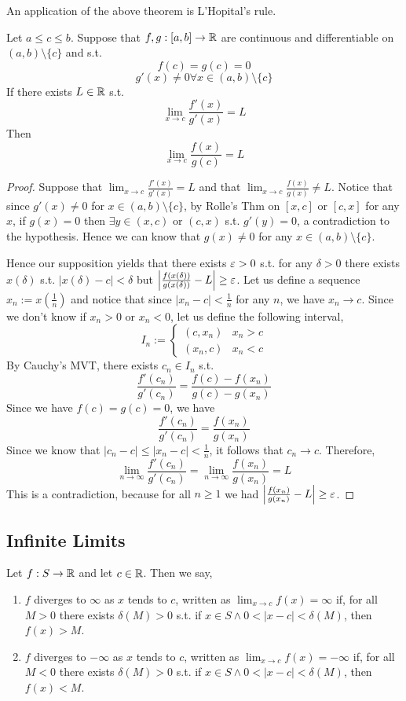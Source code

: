 An application of the above theorem is L'Hopital's rule.
\begin{theorem}
  Let $a\leq c \leq b$. Suppose that $f,g:[a,b]\to\mathbb R$ are continuous and differentiable
  on $(a,b)\setminus\{c\}$ and s.t. 
  \[f(c)=g(c)=0 \]
  \[g'(x)\neq 0 \forall x\in (a,b)\setminus\{c\}\]
  If there exists $L\in\mathbb R$ s.t. 
  \[\lim_{x\to c} \frac{f'(x)}{g'(x)}=L\]
  Then 
  \[\lim_{x\to c} \frac{f(x)}{g(c)}=L\]

  \label{<+label+>}
\end{theorem}
\begin{proof}
  Suppose that $\lim_{x\to c}\frac{f'(x)}{g'(x)}=L$ and that $\lim_{x\to
  c}\frac{f(x)}{g(x)}\neq L$. Notice that since $g'(x)\neq 0$ for $x\in
  (a,b)\setminus\{c\}$, by Rolle's Thm on $[x,c]$ or $[c,x]$ for any $x$, if $g(x)= 0$
  then $\exists y\in (x,c)$ or $(c,x)$ s.t. $g'(y)=0$, a contradiction to the hypothesis.
  Hence we can know that $g(x)\neq 0$ for any $x\in (a,b)\setminus\{c\}$.

  Hence our supposition yields that there exists $\varepsilon>0$ s.t. for any $\delta>0$ there
  exists $x(\delta)$ s.t. $|x(\delta)-c|<\delta$ but
  $\left|\frac{f(x(\delta))}{g(x(\delta))} -L\right| \geq \varepsilon$. Let us define a sequence
  $x_n:=x(\frac{1}{n})$ and notice that since $|x_n-c|<\frac{1}{n}$ for any $n$, we have
  $x_n\to c$. Since we don't know if $x_n>0$ or $x_n<0$, let us define the following
  interval,
  \[I_n := \begin{cases}
      (c,x_n) & x_n>c \\
      (x_n,c) & x_n<c
    \end{cases}
  \]
  By Cauchy's MVT, there exists $c_n\in I_n$ s.t. 
  \[ \frac{f'(c_n)}{g'(c_n)} = \frac{f(c) - f(x_n)}{g(c)-g(x_n)}\]
  Since we have $f(c)=g(c)=0$, we have 
  \[\frac{f'(c_n)}{g'(c_n)} =  \frac{f(x_n)}{g(x_n)}  \]
  Since we know that $|c_n-c|\leq |x_n-c| <\frac{1}{n}$, it follows that $c_n\to c$.
  Therefore, 
  \[\lim_{n\to \infty}\frac{f'(c_n)}{g'(c_n)} =  \lim_{n\to \infty}\frac{f(x_n)}{g(x_n)} =
  L\]
  This is a contradiction, because for all $n\geq 1$ we had
  $\left|\frac{f(x_n)}{g(x_n)}-L\right| \geq \varepsilon$.
\end{proof}

\subsection{Infinite Limits}
\begin{definition}
  Let $f:S\to\mathbb R$ and let $c\in\mathbb R$. Then we say,
  \begin{enumerate}
    \item $f$ diverges to $\infty$ as $x$ tends to $c$, written as $\lim_{x\to
      c}f(x)=\infty$ if, for all $M>0$ there exists $\delta(M)>0$ s.t. if $x\in S\land
      0<|x-c|<\delta(M)$, then $f(x)>M$.

    \item $f$ diverges to $-\infty$ as $x$ tends to $c$, written as $\lim_{x\to
      c}f(x)=-\infty$ if, for all $M<0$ there exists $\delta(M)>0$ s.t. if $x\in S\land
      0<|x-c|<\delta(M)$, then $f(x)<M$.
  \end{enumerate}
  \label{<+label+>}
\end{definition}

